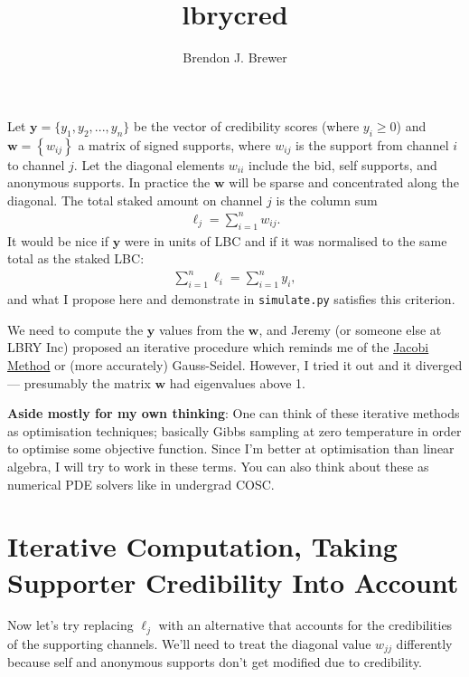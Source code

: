\documentclass[a4paper, 12pt]{article}
\title{lbrycred}
\author{Brendon J. Brewer}
\date{}
\begin{document}
\maketitle


\setlength{\parindent}{0pt}
\setlength{\parskip}{8pt}

Let $\boldsymbol{y} = \{y_1, y_2, ..., y_n\}$ be the vector of credibility
scores (where $y_i \geq 0$) and $\boldsymbol{w} = \left\{w_{ij}\right\}$
a matrix of signed supports, where
$w_{ij}$ is the support from channel $i$ to channel $j$. Let the diagonal
elements $w_{ii}$ include the bid, self supports, and anonymous supports.
In practice the $\boldsymbol{w}$ will be sparse and concentrated along the
diagonal. The total staked amount on channel $j$ is the column sum
\begin{align}
\ell_j = \sum_{i=1}^n w_{ij}.
\end{align}
It would be nice if $\boldsymbol{y}$ were in units of LBC and if
it was normalised to the same total as the staked LBC:
\begin{align}
\sum_{i=1}^n \ell_i = \sum_{i=1}^n y_i, \label{eqn:total_lbc}
\end{align}
and what I propose here and demonstrate in {\tt simulate.py} satisfies this
criterion.

We need to compute the $\boldsymbol{y}$ values from the $\boldsymbol{w}$,
and Jeremy (or someone else at LBRY Inc) proposed an iterative procedure which
reminds me of the
\href{https://en.wikipedia.org/wiki/Jacobi_method}{Jacobi Method} or
(more accurately) Gauss-Seidel. However,
I tried it out and it diverged --- presumably the matrix $\boldsymbol{w}$ had
eigenvalues above 1.

{\bf Aside mostly for my own thinking}:
One can think of these iterative methods as optimisation techniques; basically
Gibbs sampling at zero temperature in order to optimise some objective
function. Since I'm better at optimisation than linear algebra, I will try to
work in these terms. You can also think about these as numerical PDE solvers
like in undergrad COSC.


\section{Iterative Computation, Taking Supporter Credibility Into Account}
Now let's try replacing $\ell_j$ with an alternative that accounts for the
credibilities of the supporting channels. We'll need to treat the diagonal
value $w_{jj}$ differently because self and anonymous supports don't get
modified due to credibility.
\end{document}
